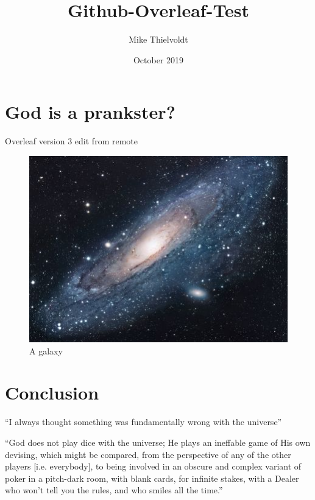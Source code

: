 \documentclass{article}
\title{Github-Overleaf-Test}
\author{Mike Thielvoldt}
\date{October 2019}
\begin{document}
\maketitle

\section{God is a prankster?}

Overleaf version 3 edit from remote

\begin{figure}[h!]
\centering
\includegraphics[scale=1.7]{universe}
\caption{A galaxy}
\label{fig:universe}
\end{figure}


\section{Conclusion}
``I always thought something was fundamentally wrong with the universe'' \citep{adams1995hitchhiker}
\newline

``God does not play dice with the universe; He plays an ineffable game of His own devising, which might be compared, from the perspective of any of the other players [i.e. everybody], to being involved in an obscure and complex variant of poker in a pitch-dark room, with blank cards, for infinite stakes, with a Dealer who won't tell you the rules, and who smiles all the time.'' \citep{pratchett1990goodomens}



\end{document}
